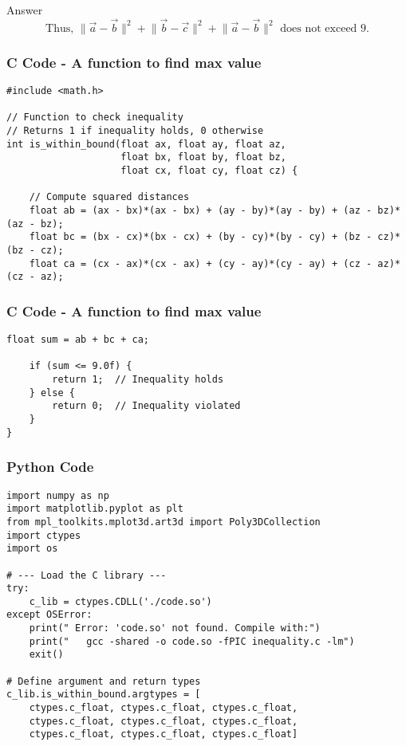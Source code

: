 \documentclass{beamer}
\begin{document}
\begin{frame}{Answer}
\[
\text{Thus, } 
\lVert \vec{a} - \vec{b} \rVert^2
+ \lVert \vec{b} - \vec{c} \rVert^2
+ \lVert \vec{a} - \vec{b} \rVert^2
\text{ does not exceed } 9.
\]
\end{frame}

\begin{frame}[fragile]
    \frametitle{C Code - A function to find max value}

    \begin{lstlisting}
#include <math.h>

// Function to check inequality
// Returns 1 if inequality holds, 0 otherwise
int is_within_bound(float ax, float ay, float az,
                    float bx, float by, float bz,
                    float cx, float cy, float cz) {
    
    // Compute squared distances
    float ab = (ax - bx)*(ax - bx) + (ay - by)*(ay - by) + (az - bz)*(az - bz);
    float bc = (bx - cx)*(bx - cx) + (by - cy)*(by - cy) + (bz - cz)*(bz - cz);
    float ca = (cx - ax)*(cx - ax) + (cy - ay)*(cy - ay) + (cz - az)*(cz - az);
     \end{lstlisting}
\end{frame}

\begin{frame}[fragile]
    \frametitle{C Code - A function to find max value  }

    \begin{lstlisting}
float sum = ab + bc + ca;

    if (sum <= 9.0f) {
        return 1;  // Inequality holds
    } else {
        return 0;  // Inequality violated
    }
}

     \end{lstlisting}
\end{frame}

\begin{frame}[fragile]
    \frametitle{Python Code}
    \begin{lstlisting}
import numpy as np
import matplotlib.pyplot as plt
from mpl_toolkits.mplot3d.art3d import Poly3DCollection
import ctypes
import os

# --- Load the C library ---
try:
    c_lib = ctypes.CDLL('./code.so')
except OSError:
    print(" Error: 'code.so' not found. Compile with:")
    print("   gcc -shared -o code.so -fPIC inequality.c -lm")
    exit()

# Define argument and return types
c_lib.is_within_bound.argtypes = [
    ctypes.c_float, ctypes.c_float, ctypes.c_float,
    ctypes.c_float, ctypes.c_float, ctypes.c_float,
    ctypes.c_float, ctypes.c_float, ctypes.c_float]
    \end{lstlisting}
\end{frame}
\end{document}
